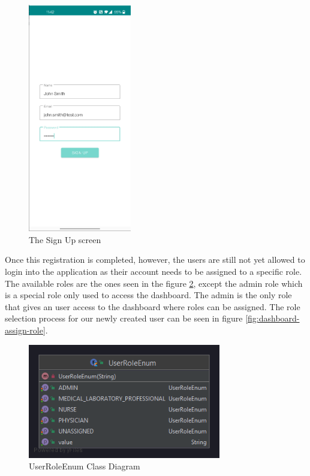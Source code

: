 \begin{figure}
\centering
\includegraphics[width=0.4\textwidth]{figures/sign_up_screen.png}
\caption{The Sign Up screen}
\label{fig:sign-up-screen}
\end{figure}

Once this registration is completed, however, the users are still not yet allowed to login into the application as their account needs to be assigned to a specific role. The available roles are the ones seen in the figure \ref{fig:user-role-enum}, except the admin role which is a special role only used to access the dashboard. The admin is the only role that gives an user access to the dashboard where roles can be assigned. The role selection process for our newly created user can be seen in figure \ref{fig:dashboard-assign-role}.

\begin{figure}
\centering
\includegraphics[width=0.75\textwidth]{figures/user-role-enum.png}
\caption{UserRoleEnum Class Diagram}
\label{fig:user-role-enum}
\end{figure}

